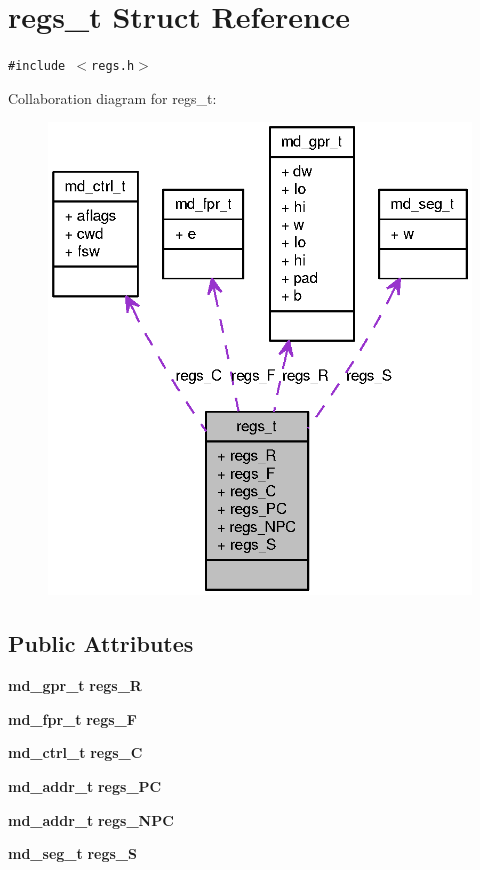 \section{regs\_\-t Struct Reference}
\label{structregs__t}
{\tt \#include $<$regs.h$>$}

Collaboration diagram for regs\_\-t:\nopagebreak
\begin{figure}[H]
\begin{center}
\leavevmode
\includegraphics[width=322pt]{structregs__t__coll__graph}
\end{center}
\end{figure}
\subsection*{Public Attributes}
\begin{CompactItemize}
\item 
{\bf md\_\-gpr\_\-t} {\bf regs\_\-R}
\item 
{\bf md\_\-fpr\_\-t} {\bf regs\_\-F}
\item 
{\bf md\_\-ctrl\_\-t} {\bf regs\_\-C}
\item 
{\bf md\_\-addr\_\-t} {\bf regs\_\-PC}
\item 
{\bf md\_\-addr\_\-t} {\bf regs\_\-NPC}
\item 
{\bf md\_\-seg\_\-t} {\bf regs\_\-S}
\end{CompactItemize}



